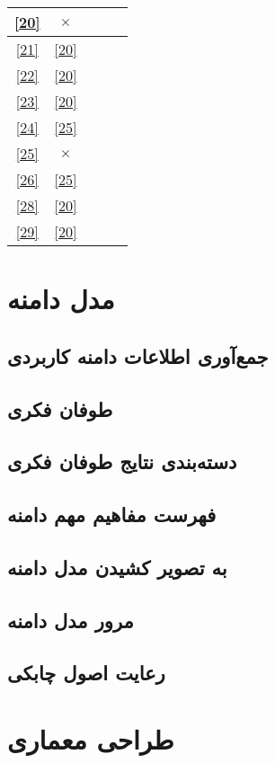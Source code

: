 \documentclass[12pt,svgnames,oneside]{book}
\begin{document}
\begin{center}
\begin{longtable}{|c|c|c|c|c|}
						\ref{20} & $\times$ & \checkmark & & \\ \hline
						\ref{21} & \ref{20} & \checkmark & & \\ \hline
						\ref{22} & \ref{20} & \checkmark & & \\ \hline
						\ref{23} & \ref{20} & \checkmark & & \\ \hline
						\ref{24} & \ref{25} & \checkmark & & \\ \hline
						\ref{25} & $\times$ & \checkmark & & \\ \hline
						\ref{26} & \ref{25} & \checkmark & & \\ \hline
						\ref{28} & \ref{20} & \checkmark & & \\ \hline
						\ref{29} & \ref{20} & \checkmark & & \\ \hline
					\end{longtable}
				\end{center}
			
			
	\chapter{مدل دامنه}
		\section{جمع‌آوری اطلاعات دامنه کاربردی}
		\section{طوفان فکری}
		\section{دسته‌بندی نتایج طوفان فکری}
		\section{فهرست مفاهیم مهم دامنه}
		\section{به تصویر کشیدن مدل دامنه}
		\section{مرور مدل دامنه}
		\section{رعایت اصول چابکی}
		
	\chapter{طراحی معماری}
\end{document}
